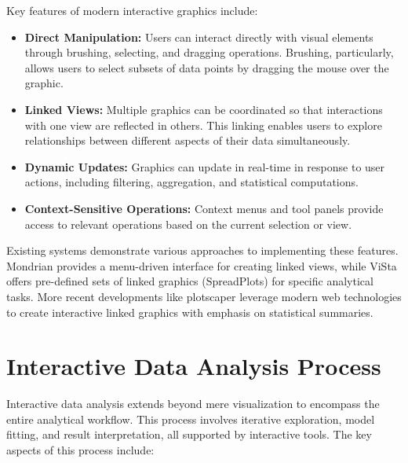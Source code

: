 \documentclass{article}
\newcommand{\prog}[1]{{\sf #1}}
\newcommand{\proglang}[1]{\prog{#1}}
\begin{document}
Key features of modern interactive graphics include:

\begin{itemize}
\item \textbf{Direct Manipulation:} Users can interact directly with visual elements through brushing, selecting, and dragging operations. Brushing, particularly, allows users to select subsets of data points by dragging the mouse over the graphic.

\item \textbf{Linked Views:} Multiple graphics can be coordinated so that interactions with one view are reflected in others. This linking enables users to explore relationships between different aspects of their data simultaneously.

\item \textbf{Dynamic Updates:} Graphics can update in real-time in response to user actions, including filtering, aggregation, and statistical computations.

\item \textbf{Context-Sensitive Operations:} Context menus and tool panels provide access to relevant operations based on the current selection or view.
\end{itemize}

Existing systems demonstrate various approaches to implementing these features. \proglang{Mondrian} \parencite{Theus2014} provides a menu-driven interface for creating linked views, while \proglang{ViSta} \parencite{Young1996,Young2011} offers pre-defined sets of linked graphics (SpreadPlots) for specific analytical tasks. More recent developments like \proglang{plotscaper} \cite{Bartonicek2024} leverage modern web technologies to create interactive linked graphics with emphasis on statistical summaries.

\section{Interactive Data Analysis Process}
\label{sec:interactive-data-analysis}

Interactive data analysis extends beyond mere visualization to encompass the entire analytical workflow. This process involves iterative exploration, model fitting, and result interpretation, all supported by interactive tools. The key aspects of this process include:
\end{document}
